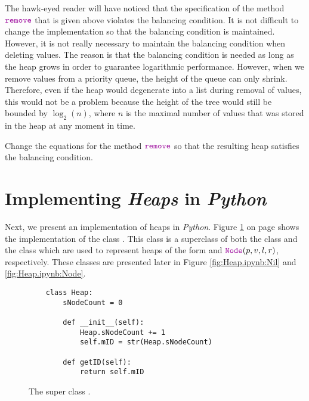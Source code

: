 The hawk-eyed reader will have noticed that the specification of the method $\mytt{remove}$ that is given
above violates the balancing condition.  It is not difficult to change the implementation so that
the balancing condition is maintained.  However, it is not really necessary to maintain the
balancing condition when deleting values.  The reason is that the balancing condition is needed as
long as the heap grows in order to guarantee logarithmic  performance.  However, when we remove
values from a priority queue, the height of the queue can only shrink.  Therefore, even if the heap
would degenerate into a list during removal of values, this would not be a problem because the
height of the tree would still be bounded by $\log_2(n)$, where $n$ is the maximal number of
values that was stored in the heap at any moment in time.

\exercise
Change the equations for the method $\mytt{remove}$ so that the resulting heap satisfies the
balancing condition.



\section[Implementation]{Implementing \textsl{Heaps} in \textsl{Python}}
Next, we present an implementation of heaps in \textsl{Python}.  Figure \ref{fig:Heap.ipynb:Heap} on page
\pageref{fig:Heap.ipynb:Heap} shows the implementation of the class  .  This class is a superclass
of both the class  and the class  which are used to represent heaps of the form
 and $\mytt{Node}(p, v, l, r)$, respectively.  These classes are presented later in Figure
\ref{fig:Heap.ipynb:Nil} and \ref{fig:Heap.ipynb:Node}.


\begin{figure}[!ht]
\centering
\begin{verbatim}
    class Heap:
        sNodeCount = 0
        
        def __init__(self):
            Heap.sNodeCount += 1
            self.mID = str(Heap.sNodeCount)
            
        def getID(self):
            return self.mID                 
\end{verbatim}
\vspace*{-0.3cm}
\caption{The super class .}
\label{fig:Heap.ipynb:Heap}
\end{figure}

